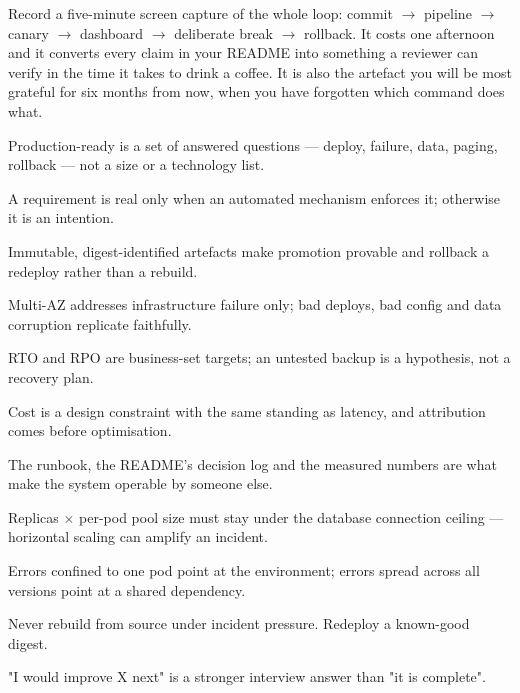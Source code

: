 \begin{prodtip}
Record a five-minute screen capture of the whole loop: commit $\rightarrow$ pipeline $\rightarrow$ canary $\rightarrow$ dashboard $\rightarrow$ deliberate break $\rightarrow$ rollback. It costs one afternoon and it converts every claim in your README into something a reviewer can verify in the time it takes to drink a coffee. It is also the artefact you will be most grateful for six months from now, when you have forgotten which command does what.
\end{prodtip}


\begin{tickcheck}
  \item Production-ready is a set of answered questions --- deploy, failure, data, paging, rollback --- not a size or a technology list.
  \item A requirement is real only when an automated mechanism enforces it; otherwise it is an intention.
  \item Immutable, digest-identified artefacts make promotion provable and rollback a redeploy rather than a rebuild.
  \item Multi-AZ addresses infrastructure failure only; bad deploys, bad config and data corruption replicate faithfully.
  \item RTO and RPO are business-set targets; an untested backup is a hypothesis, not a recovery plan.
  \item Cost is a design constraint with the same standing as latency, and attribution comes before optimisation.
  \item The runbook, the README's decision log and the measured numbers are what make the system operable by someone else.
\end{tickcheck}

\begin{wbitem}
  \item Replicas $\times$ per-pod pool size must stay under the database connection ceiling --- horizontal scaling can amplify an incident.
  \item Errors confined to one pod point at the environment; errors spread across all versions point at a shared dependency.
  \item Never rebuild from source under incident pressure. Redeploy a known-good digest.
  \item "I would improve X next" is a stronger interview answer than "it is complete".
\end{wbitem}

